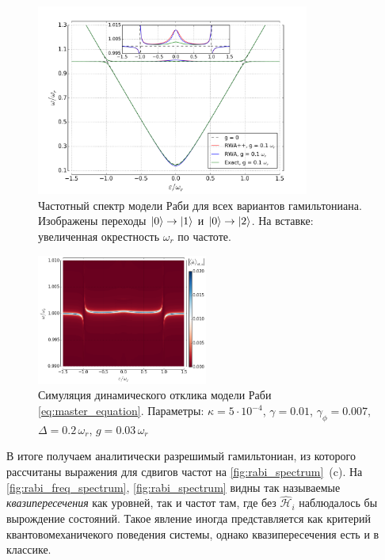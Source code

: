 \documentclass[12pt, twoside]{report}
\DeclarePairedDelimiter\ket{\lvert}{\rangle}
\numberwithin{equation}{section}
\numberwithin{figure}{section}
\begin{document}
\begin{figure}[h!]
\centering
\includegraphics[width=0.8\textwidth]{Pictures/rabi_spectrum_freq}
\caption{Частотный спектр модели Раби для всех вариантов гамильтониана. Изображены переходы $\ket{0}\rightarrow\ket{1}$ и $\ket{0}\rightarrow\ket{2}$. На вставке: увеличенная окрестность $\omega_r$ по частоте.}
\label{fig:rabi_freq_spectrum}
\end{figure}


\begin{figure}
\includegraphics[width=0.5\textwidth]{Pictures/Rabi_anticrossing_far_dyn}
\caption{Симуляция динамического отклика модели Раби \eqref{eq:master_equation}. Параметры: $\kappa = 5\cdot 10^{-4}$, $\gamma = 0.01$, $\gamma_\phi = 0.007$, $\Delta = 0.2\,\omega_r$, $g=0.03\,\omega_r$}
\label{fig:rabi_spec_dyn}
\end{figure}

В итоге получаем аналитически разрешимый гамильтониан\cite{Jerger2013}, из которого рассчитаны выражения для сдвигов частот на \autoref{fig:rabi_spectrum}~(c). На \autoref{fig:rabi_freq_spectrum}, \autoref{fig:rabi_spectrum} видны так называемые \textit{квазипересечения} как уровней, так и частот там, где без $\mathcal{\hat H}_i$ наблюдалось бы вырождение состояний. Такое явление иногда представляется как критерий квантовомеханичекого поведения системы, однако квазипересечения есть и в классике\cite{novotny2010}. 
\end{document}

